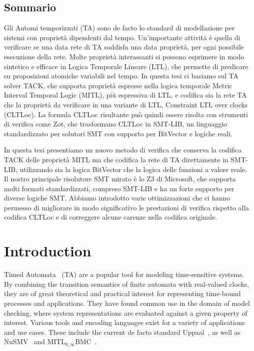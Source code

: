 \documentclass[a4paper,11pt]{report}
\theoremstyle{definition}
\begin{document}
\section*{Sommario}\label{sommario}

Gli Automi temporizzati (TA) sono de facto lo standard di modellazione per
sistemi con proprietà dipendenti dal tempo. Un'importante attivit\`{a} \`{e}
quella di verificare se una data rete di TA soddisfa una data propriet\`{a}, per
ogni possibile esecuzione della rete. Molte propriet\`{a} interassanti si
possono esprimere in modo sintetico e efficace in Logica Temporale Lineare
(LTL), che permette di predicare su proposizioni atomiche variabili nel tempo.
In questa tesi ci basiamo sul TA solver TACK, che supporta propriet\`{a}
espresse nella logica temporale Metric Interval Temporal Logic (MITL), pi\`{u}
espressiva di LTL, e codifica sia la rete TA che la propriet\`{a} da verificare
in una variante di LTL, Constraint LTL over clocks (CLTLoc). La formula CLTLoc
risultante pu\`{o} quindi essere risolta con strumenti di verifica come Zot, che
trasformano CLTLoc in SMT-LIB, un linguaggio standardizzato per solutori SMT
con supporto per BitVector e logiche reali.

In questa tesi presentiamo un nuovo metodo di verifica che conserva la codifica
TACK delle propriet\`{a} MITL ma che codifica la rete di TA direttamente in
SMT-LIB, utilizzando sia la logica BitVector che la logica delle funzioni a
valore reale. Il nostro principale risolutore SMT mirato \`{e} lo Z3 di
Microsoft, che supporta molti formati standardizzati, compreso SMT-LIB e ha un
forte supporto per diverse logiche SMT\@. Abbiamo introdotto varie
ottimizzazioni che ci hanno permesso di migliorare in modo significativo le
prestazioni di verifica rispetto alla codifica CLTLoc e di correggere alcune
carenze nella codifica originale.
\chapter{Introduction}\label{introduction}

Timed Automata~\cite{alur94} (TA) are a popular tool for modeling time-sensitive
systems. By combining the transition semantics of finite automata with
real-valued clocks, they are of great theoretical and practical interest for
representing time-bound processes and applications. They have found common use
in the domain of model checking, where system representations are evaluated
against a given property of interest. Various tools and encoding languages exist
for a variety of applications and use cases. These include the current de facto
standard Uppaal~\cite{larsen97}, as well as NuSMV~\cite{cimatti02} and
$\text{MITL}_{0,\infty}$BMC~\cite{kindermann13}.
\end{document}
